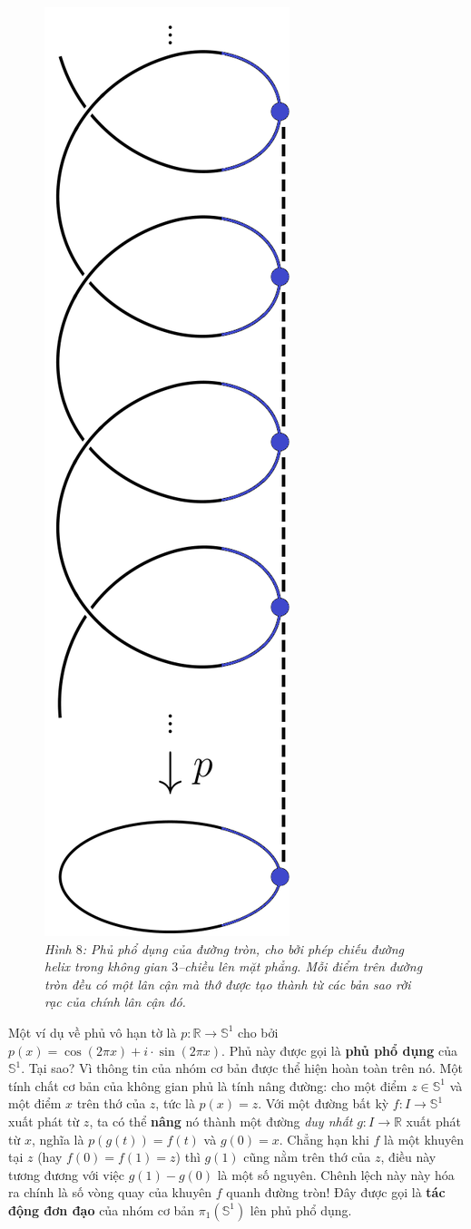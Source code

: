 \begin{multicols}{2}
		\begin{figure}[H]
		\vspace*{-5pt}
		\centering
		\captionsetup{labelformat= empty, justification=centering}
		\includegraphics[width= 0.2\linewidth]{h8.png}
		\caption{\small\textit{\color{duongvaotoanhoc}Hình $8$: Phủ phổ dụng của đường tròn, cho bởi phép chiếu đường helix trong không gian $3$--chiều lên mặt phẳng. Mỗi điểm trên đường tròn đều có một lân cận mà thớ được tạo thành từ các bản sao rời rạc của chính lân cận đó.}}
		\vspace*{-10pt}
	\end{figure}
	Một ví dụ về phủ vô hạn tờ là $p: \mathbb{R} \to \mathbb{S}^1$ cho bởi $p(x) = \cos(2\pi x)+i \cdot \sin(2\pi x)$. Phủ này được gọi là {\bf\color{duongvaotoanhoc} phủ phổ dụng} của $\mathbb{S}^1$. Tại sao? Vì thông tin của nhóm cơ bản được thể hiện hoàn toàn trên nó. Một tính chất cơ bản của không gian phủ là tính nâng đường: cho một điểm $z \in \mathbb{S}^1$ và một điểm $x$ trên thớ của $z$, tức là $p(x) = z$. Với một đường bất kỳ $f: I \to \mathbb{S}^1$ xuất phát từ $z$, ta có thể {\bf\color{duongvaotoanhoc} nâng} nó thành một đường {\it duy nhất} $g: I \to \mathbb{R}$ xuất phát từ $x$, nghĩa là $p(g(t)) = f(t)$ và $g(0) = x$. Chẳng hạn khi $f$ là một khuyên tại $z$ (hay $f(0) = f(1) = z$) thì $g(1)$ cũng nằm trên thớ của $z$, điều này tương đương với việc $g(1) - g(0)$ là một số nguyên. Chênh lệch này này hóa ra chính là số vòng quay của khuyên $f$ quanh đường tròn! Đây được gọi là {\bf\color{duongvaotoanhoc} tác động đơn đạo} của nhóm cơ bản $\pi_1(\mathbb{S}^1)$ lên phủ phổ dụng.
	\begin{figure}[H]

\end{figure}
\end{multicols}
